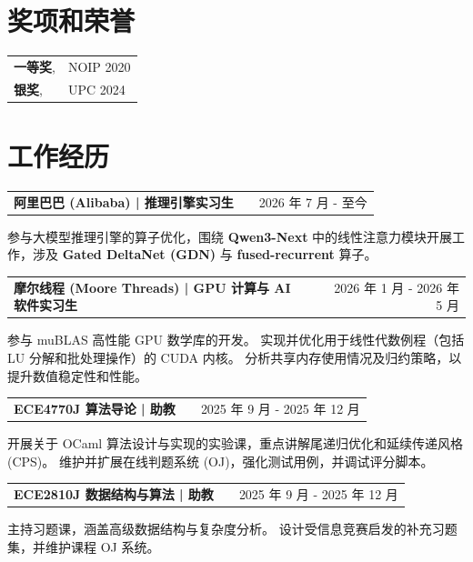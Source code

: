 \documentclass[a4paper,12pt]{article}
\makeatletter
\newenvironment{jobshort}[2]
    {
    \begin{tabularx}{\linewidth}{@{}l X r@{}}
    \textbf{#1} & \hfill &  #2 \\[3.75pt]
    \end{tabularx}
    }
    {
    }
\makeatother
\begin{document}

\section{奖项和荣誉}
\begin{tabularx}{\linewidth}{@{}l X@{}}
\textbf{一等奖}, & NOIP 2020 \\
\textbf{银奖}, & UPC 2024
\end{tabularx}



\section{工作经历}

\begin{jobshort}{阿里巴巴 (Alibaba) | 推理引擎实习生}{2026 年 7 月 - 至今}
参与大模型推理引擎的算子优化，围绕 \textbf{Qwen3-Next} 中的线性注意力模块开展工作，涉及 \textbf{Gated DeltaNet (GDN)} 与 \textbf{fused-recurrent} 算子。
\end{jobshort}

\begin{jobshort}{摩尔线程 (Moore Threads) | GPU 计算与 AI 软件实习生}{2026 年 1 月 - 2026 年 5 月}
参与 muBLAS 高性能 GPU 数学库的开发。
实现并优化用于线性代数例程（包括 LU 分解和批处理操作）的 CUDA 内核。
分析共享内存使用情况及归约策略，以提升数值稳定性和性能。
\end{jobshort}

\begin{jobshort}{ECE4770J 算法导论 | 助教}{2025 年 9 月 - 2025 年 12 月}
开展关于 OCaml 算法设计与实现的实验课，重点讲解尾递归优化和延续传递风格 (CPS)。
维护并扩展在线判题系统 (OJ)，强化测试用例，并调试评分脚本。
\end{jobshort}

\begin{jobshort}{ECE2810J 数据结构与算法 | 助教}{2025 年 9 月 - 2025 年 12 月}
主持习题课，涵盖高级数据结构与复杂度分析。
设计受信息竞赛启发的补充习题集，并维护课程 OJ 系统。
\end{jobshort}

\end{document}
